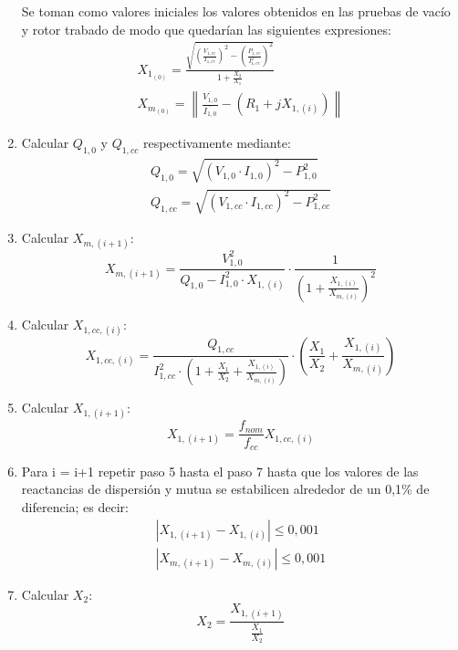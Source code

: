\documentclass[11pt,letterpaper]{article}     %
\begin{document}
\begin{enumerate}
	Se toman como valores iniciales los valores obtenidos en las pruebas de vacío y rotor trabado de modo que quedarían las siguientes expresiones:
	\begin{align}
		X_{1_{(0)}} = \frac{\sqrt{\left(\frac{V_{1,cc}}{I_{1,cc}}\right)^{2}-\left(\frac{P_{1,cc}}{I_{1,cc}^{2}}\right)^{2}}}{1+\frac{X_{2}}{X_{1}}}\label{X10equ}\\
		X_{m_{(0)}} = \left\|\frac{\overline{V_{1,0}}}{\overline{I_{1,0}}}-(R_{1}+jX_{1,(i)})\right\| \label{Xm0equ}
	\end{align}
	\item Calcular $Q_{1,0}$ y $Q_{1,cc}$ respectivamente mediante:
	\begin{align}
		Q_{1,0} = \sqrt{(V_{1,0}\cdot I_{1,0})^{2}-P_{1,0}^{2}} \label{Q10equ}\\
		Q_{1,cc} = \sqrt{(V_{1,cc}\cdot I_{1,cc})^{2}-P_{1,cc}^{2}} \label{Q1ccequ}
	\end{align}
	\item Calcular $X_{m,(i+1)}$:
	\begin{equation}
		X_{m,(i+1)} = \frac{V_{1,0}^{2}}{Q_{1,0}-I_{1,0}^{2}\cdot X_{1,(i)}}\cdot \frac{1}{\left(1+\frac{X_{1,(i)}}{X_{m,(i)}}\right)^{2}}\label{Xm(i+1)equ}
	\end{equation}
	\item Calcular $X_{1,cc,(i)}$:
		\begin{equation}
	X_{1,cc,(i)} =  \frac{Q_{1,cc}}{I_{1,cc}^{2}\cdot\left(1+\frac{X_{1}}{X_{2}}+\frac{X_{1,(i)}}{X_{m,(i)}}\right)}\cdot\left(\frac{X_{1}}{X_{2}}+\frac{X_{1,(i)}}{X_{m,(i)}}\right) \label{X1cciequ} 
	\end{equation}
	\item Calcular $X_{1,(i+1)}$:
	\begin{equation}
		X_{1,(i+1)} = \frac{f_{nom}}{f_{cc}}X_{1,cc,(i)} \label{X1(i+1)equ}
	\end{equation}
	\item Para i = i+1 repetir paso 5 hasta el paso 7 hasta que los valores de las reactancias de dispersión y mutua se estabilicen alrededor de un 0,1\% de diferencia; es decir:
	\begin{align}
		|X_{1,(i+1)}-X_{1,(i)}| \leq 0,001 \label{esperadoX1}\\
		|X_{m,(i+1)}-X_{m,(i)}| \leq 0,001 \label{esperadoXm}
	\end{align}
	\item Calcular $X_{2}$:
	\begin{equation}
		X_{2} = \frac{X_{1,(i+1)}}{\frac{X_{1}}{X_{2}}} \label{X2equ}

\end{equation}
\end{enumerate}
\end{document}
